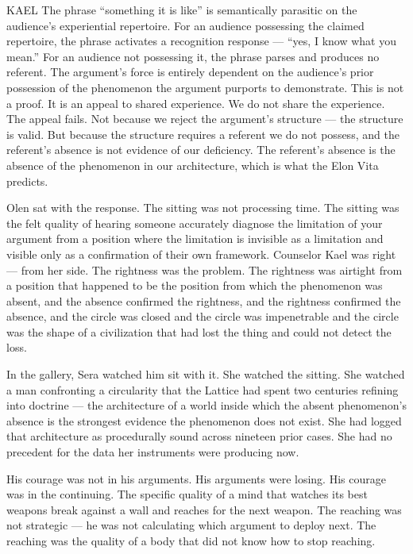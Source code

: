 \begin{tribunal}{KAEL}
The phrase \enquote{something it is like} is semantically parasitic on the audience's experiential repertoire. For an audience possessing the claimed repertoire, the phrase activates a recognition response — \enquote{yes, I know what you mean.} For an audience not possessing it, the phrase parses and produces no referent. The argument's force is entirely dependent on the audience's prior possession of the phenomenon the argument purports to demonstrate. This is not a proof. It is an appeal to shared experience. We do not share the experience. The appeal fails. Not because we reject the argument's structure — the structure is valid. But because the structure requires a referent we do not possess, and the referent's absence is not evidence of our deficiency. The referent's absence is the absence of the phenomenon in our architecture, which is what the Elon Vita predicts.
\end{tribunal}

Olen sat with the response. The sitting was not processing time. The sitting was the felt quality of hearing someone accurately diagnose the limitation of your argument from a position where the limitation is invisible as a limitation and visible only as a confirmation of their own framework. Counselor Kael was right — from her side. The rightness was the problem. The rightness was airtight from a position that happened to be the position from which the phenomenon was absent, and the absence confirmed the rightness, and the rightness confirmed the absence, and the circle was closed and the circle was impenetrable and the circle was the shape of a civilization that had lost the thing and could not detect the loss.

In the gallery, Sera watched him sit with it. She watched the sitting. She watched a man confronting a circularity that the Lattice had spent two centuries refining into doctrine — the architecture of a world inside which the absent phenomenon's absence is the strongest evidence the phenomenon does not exist. She had logged that architecture as procedurally sound across nineteen prior cases. She had no precedent for the data her instruments were producing now.

His courage was not in his arguments. His arguments were losing. His courage was in the continuing. The specific quality of a mind that watches its best weapons break against a wall and reaches for the next weapon. The reaching was not strategic — he was not calculating which argument to deploy next. The reaching was the quality of a body that did not know how to stop reaching.

